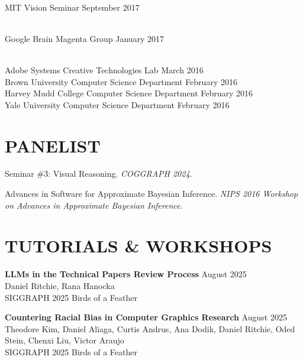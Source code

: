\documentclass[line,margin]{res}
\begin{document}
\begin{resume}
\\
\talk
	{MIT}
	{Vision Seminar}
	{September 2017}

\\
\talk
	{Google Brain}
	{Magenta Group}
	{January 2017}

\\
\talk
	{Adobe Systems}
	{Creative Technologies Lab}
	{March 2016}\\
\talk
	{Brown University}
	{Computer Science Department}
	{February 2016}\\
\talk
	{Harvey Mudd College}
	{Computer Science Department}
	{February 2016}\\
\talk
	{Yale University}
	{Computer Science Department}
	{February 2016}


\section{PANELIST}

\newcommand{\panelist}[2]{
	#1. \emph{#2}.
}

\panelist{Seminar \#3: Visual Reasoning}{COGGRAPH 2024}

\panelist{Advances in Software for Approximate Bayesian Inference}{NIPS 2016 Workshop on Advances in Approximate Bayesian Inference}


\section{TUTORIALS \& WORKSHOPS}

\newcommand{\tutorial}[4] {
	\textbf{#1} \hfill #4\\
	#2\\
	#3
}
\newcommand{\workshop}[4] {
	\textbf{#1} \hfill #4\\
	#2\\
	#3
}

\workshop
{LLMs in the Technical Papers Review Process}
{Daniel Ritchie, Rana Hanocka}
{SIGGRAPH 2025 Birds of a Feather}
{August 2025}

\workshop
{Countering Racial Bias in Computer Graphics Research}
{Theodore Kim, Daniel Aliaga, Curtis Andrus, Ana Dodik, Daniel Ritchie, Oded Stein, Chenxi Liu, Victor Araujo}
{SIGGRAPH 2025 Birds of a Feather}
{August 2025}


\end{resume}
\end{document}
